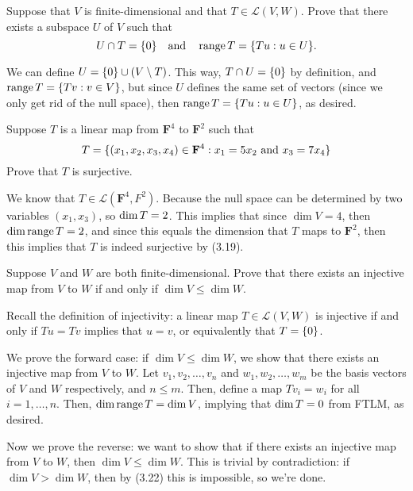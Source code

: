 \documentclass[10pt]{article}
\newcommand{\F}{\mathbf F}
\begin{document}
	\begin{problem}
		Suppose that \( V \) is finite-dimensional and that \( T \in \mathcal L(V, W). \) Prove that there 
		exists a subspace \( U \) of \( V \) such that 
		\[
		U \cap \null T = \{0\}  \quad \text{and} \quad \range T = \{Tu :u \in U\}.
		\] 
	\end{problem}

	\begin{solution}
		We can define \( U = \{0\} \cup (V \setminus \null T) \). This way, \( \null T \cap U = \{0\}  \) by 
		definition, and \( \operatorname*{range} T = \{Tv: v\in V\}  \), but since \( U \) defines the same set of vectors 
		(since we only get rid of the null space), then \( \operatorname*{range} T = \{Tu: u \in U\}  \), as desired. 
	\end{solution}

	\begin{problem}
		Suppose \( T \) is a linear map from \( \F^{4} \) to \( \F^{2} \) such that 
		\[
		\null T = \{(x_1, x_2, x_3, x_4) \in \F^{4}: x_1 = 5x_2 \ \text{and} \ x_3 = 7x_4\} 
		\] 
		Prove that \( T \) is surjective.
	\end{problem}

	\begin{solution}
		We know that \( T \in \mathcal L(\F^{4}, F^{2}) \). Because the null space can be determined by two variables
		\( (x_1, x_3) \), so \( \dim \null T = 2 \). This implies that since  \( \dim V = 4 \), then 
		\( \dim \operatorname*{range} T = 2 \), and since this equals the dimension that \( T \) maps to \( \F^2 \), then 
		this implies that \( T  \) is indeed surjective by (3.19).
	\end{solution}

	\begin{problem}
		Suppose \( V \) and \( W \) are both finite-dimensional. Prove that there exists an injective map 
		from \( V \) to \( W \) if and only if \( \dim V \le \dim W \). 
	\end{problem}

	\begin{solution}
		Recall the definition of injectivity: a linear map \( T \in \mathcal L(V, W)  \) is injective if and only if 
		\( Tu = Tv \) implies that \( u = v \), or equivalently that \( \null T = \{ 0 \}  \). 

		We prove the forward case: if \( \dim V \le \dim W \), we show that there exists 
		an injective map from \( V \) to \( W \). Let \( v_1, v_2, \dots, v_n \) and \( w_1, w_2, \dots, w_m \) 
		be the basis vectors of \( V \) and \( W \) respectively, and \( n \le m \). Then, define a map
		\( Tv_i = w_i \) for all \( i = 1, \dots, n \). Then, \( \dim \operatorname*{range} T = \dim V \), implying 
		that \( \dim \null T = 0 \) from FTLM, as desired. 

		Now we prove the reverse: we want to show that if there exists an 
		injective map from \( V \) to \( W \), then \( \dim V \le \dim W \). This is trivial by contradiction:
		if \( \dim V > \dim W \), then by (3.22) this is impossible, so we're done.   
	\end{solution}
\end{document}
